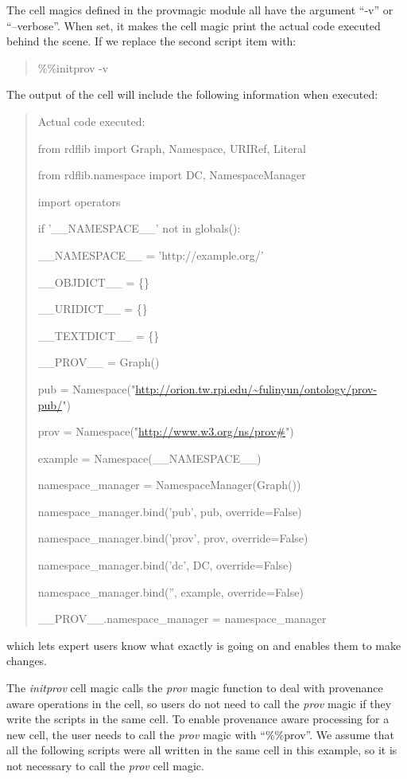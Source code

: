 The cell magics defined in the provmagic module all have the argument ``-v'' or ``--verbose''. When set, it makes the cell magic print the actual code executed behind the scene. If we replace the second script item with:
\begin{quotation}
\noindent\%\%initprov -v
\end{quotation}
The output of the cell will include the following information when executed:
\begin{quotation}
\noindent Actual code executed:

\noindent from rdflib import Graph, Namespace, URIRef, Literal

\noindent from rdflib.namespace import DC, NamespaceManager

\noindent import operators

\noindent if '\_\_NAMESPACE\_\_' not in globals():

\noindent \_\_NAMESPACE\_\_ = 'http://example.org/'

\noindent \_\_OBJDICT\_\_ = \{\}

\noindent \_\_URIDICT\_\_ = \{\}

\noindent \_\_TEXTDICT\_\_ = \{\}

\noindent \_\_PROV\_\_ = Graph()

\noindent pub = Namespace("\url{http://orion.tw.rpi.edu/~fulinyun/ontology/prov-pub/}")

\noindent prov = Namespace("\url{http://www.w3.org/ns/prov#}")

\noindent example = Namespace(\_\_NAMESPACE\_\_)

\noindent namespace\_manager = NamespaceManager(Graph())

\noindent namespace\_manager.bind('pub', pub, override=False)

\noindent namespace\_manager.bind('prov', prov, override=False)

\noindent namespace\_manager.bind('dc', DC, override=False)

\noindent namespace\_manager.bind('', example, override=False)

\noindent \_\_PROV\_\_.namespace\_manager = namespace\_manager
\end{quotation}
which lets expert users know what exactly is going on and enables them to make changes.

The \emph{initprov} cell magic calls the \emph{prov} magic function to deal with provenance aware operations in the cell, so users do not need to call the \emph{prov} magic if they write the scripts in the same cell. To enable provenance aware processing for a new cell, the user needs to call the \emph{prov} magic with ``\%\%prov''. We assume that all the following scripts were all written in the same cell in this example, so it is not necessary to call the \emph{prov} cell magic.

